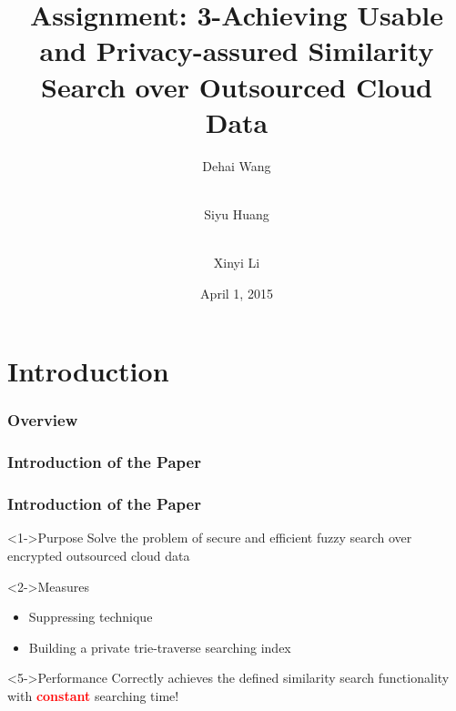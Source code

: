 \documentclass[handout]{beamer}
\title[Assignment3]{Assignment: 3-Achieving Usable and Privacy-assured Similarity Search over Outsourced Cloud Data} %
\author[Author, Another, Another] %
{Dehai Wang \and \\Siyu Huang\and \\ Xinyi Li}
\institute[DLUT] %
{
Dalian University of Technology \\
\textit{Assignment of System Security} %
\medskip %
}
\date{April 1, 2015} %
\begin{document}
\section{Introduction}
\begin{frame}
\titlepage %
\end{frame}

\begin{frame}
	\frametitle{Overview} %
	\tableofcontents %
\end{frame}
\begin{frame}
	\frametitle{Introduction of the Paper}
	    
\end{frame}

\begin{frame}
 \frametitle{Introduction of the Paper}
 \begin{block}<1->{Purpose}
  Solve the problem of secure and efficient fuzzy search over encrypted outsourced cloud data
  \end{block}
  
  \begin{block}<2->{Measures}
  	\begin{itemize}
  		\item<3-> Suppressing technique 
  		\item<4-> Building a private trie-traverse searching index
  	\end{itemize}
  \end{block}
  
  \begin{block}<5->{Performance}
	  Correctly achieves the defined similarity search functionality with \textbf{\textcolor{red}{constant}}  searching time!
  \end{block}
  
  
\end{frame}


\end{document}

